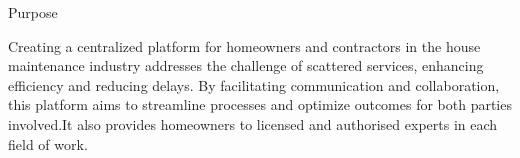 \documentclass{beamer} %
\begin{document}
\begin{frame}{Purpose}
    
                Creating a centralized platform for homeowners and contractors in the house maintenance industry addresses the challenge of scattered services, enhancing efficiency and reducing delays. By facilitating communication and collaboration, this platform aims to streamline processes and optimize outcomes for both parties involved.It also provides homeowners to licensed and authorised experts in each field of work.
    
    
    \vspace{10pt} %
    \begin{figure}
        \hfill
    \end{figure}
    
\end{frame}

%       
  
\end{document}

